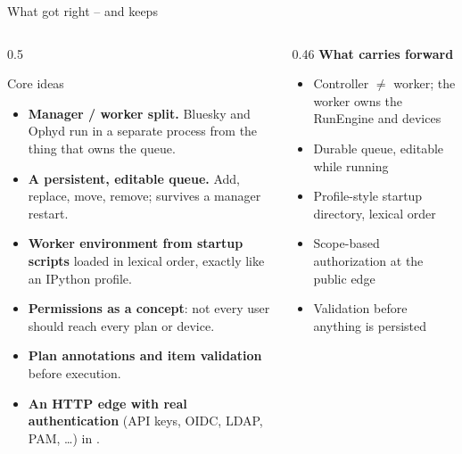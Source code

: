 \begin{frame}{What \legacy{} got right -- and \vtwo{} keeps}
    \begin{columns}[T]
        \begin{column}{0.5\textwidth}
            \begin{exampleblock}{Core ideas}
                \footnotesize
                \begin{itemize}
                    \item \textbf{Manager / worker split.} Bluesky and Ophyd run in a separate process
                          from the thing that owns the queue.
                    \item \textbf{A persistent, editable queue.} Add, replace, move, remove;
                          survives a manager restart.
                    \item \textbf{Worker environment from startup scripts} loaded in lexical order,
                          exactly like an IPython profile.
                    \item \textbf{Permissions as a concept}: not every user should reach every plan or device.
                    \item \textbf{Plan annotations and item validation} before execution.
                    \item \textbf{An HTTP edge with real authentication} (API keys, OIDC, LDAP, PAM, \ldots)
                          in .
                \end{itemize}
            \end{exampleblock}
        \end{column}
        \begin{column}{0.46\textwidth}
            \footnotesize
            \textbf{What \vtwo{} carries forward}
            \begin{itemize}
                \item Controller $\neq$ worker; the worker owns the RunEngine and devices
                \item Durable queue, editable while running
                \item Profile-style startup directory, lexical order
                \item Scope-based authorization at the public edge
                \item Validation before anything is persisted
            \end{itemize}

\end{column}
\end{columns}
\end{frame}
